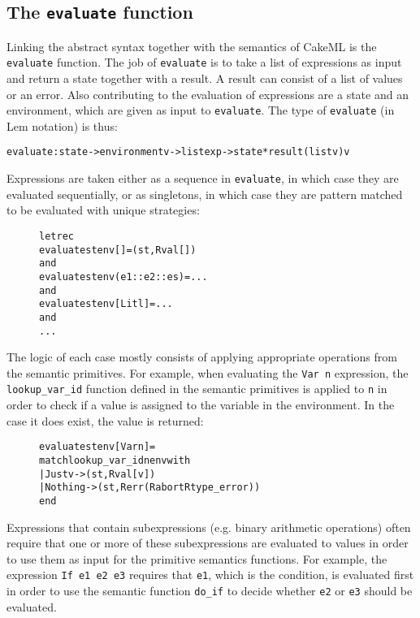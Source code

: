 
\subsection{The \texttt{evaluate} function}
Linking the abstract syntax together with the semantics of CakeML is the
\texttt{evaluate} function. The job of \texttt{evaluate} is to take a list of
expressions as input and return a state together with a result. A result can
consist of a list of values or an error. Also contributing to the evaluation
of expressions are a state and an environment, which are given as input to
\texttt{evaluate}. The type of \texttt{evaluate} (in Lem notation) is thus:

\begin{alltt}
evaluate:state -> environment v -> list exp -> state * result (list v) v
\end{alltt}

\noindent Expressions are taken either as a sequence in \texttt{evaluate},
in which case they are evaluated sequentially, or as singletons, in which case
they are pattern matched to be evaluated with unique strategies:

\begin{figure}[H]
\begin{alltt}
  let rec
  evaluate st env []           = (st, Rval [])
  and
  evaluate st env (e1::e2::es) = ...
  and
  evaluate st env [Lit l]      = ...
  and
  ...
\end{alltt}
\end{figure}

\noindent The logic of each case mostly consists of applying appropriate
operations from the semantic primitives. For example, when evaluating
the \texttt{Var n} expression, the \texttt{lookup\_var\_id} function defined
in the semantic primitives is applied to \texttt{n} in order to check if
a value is assigned to the variable in the environment. In the case it does
exist, the value is returned:

\begin{figure}[H]
\begin{alltt}
  evaluate st env [Var n] =
    match lookup_var_id n env with
    | Just v -> (st, Rval [v])
    | Nothing -> (st, Rerr (Rabort Rtype_error))
    end
\end{alltt}
\end{figure}

\noindent Expressions that contain subexpressions (e.g. binary arithmetic
operations) often require that one or more of these subexpressions are
evaluated to values in order to use them as input for the primitive semantics
functions. For example, the expression \texttt{If e1 e2 e3} requires that
\texttt{e1}, which is the condition, is evaluated first in order to use the
semantic function \texttt{do\_if} to decide whether \texttt{e2} or
\texttt{e3} should be evaluated.

